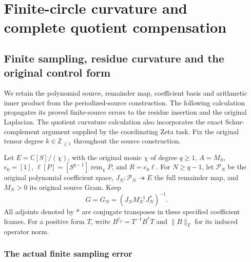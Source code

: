 \begingroup

\section{Finite-circle curvature and complete quotient compensation}


\subsection{Finite sampling, residue curvature and the original control form}
\label{sec:periodized-curvature-control}

We retain the polynomial source, remainder map, coefficient basis and
arithmetic inner product from the periodized-source construction. The
following calculation propagates its proved finite-source errors to the
residue insertion and the original Laplacian. The quotient curvature
calculation also incorporates the exact Schur-complement argument supplied
by the coordinating Zeta task. Fix the original tensor degree
$k\in\mathbb Z_{\ge1}$ throughout the source construction.

Let $E=\mathbb C[S]/(\chi)$, with the original monic $\chi$ of degree
$q\ge1$, $A=M_S$, $e_0=[1]$, $\ell[P]=[S^{q-1}]\operatorname{rem}_\chi P$,
and $R=e_0\ell$. For $N\ge q-1$, let $\mathcal P_N$ be the original
polynomial coefficient space, $J_N:\mathcal P_N\twoheadrightarrow E$
the full remainder map, and $M_N>0$ its original source Gram. Keep
\[
 G=G_N=(J_NM_N^{-1}J_N^*)^{-1}.
 \tag{FC1}
\]
All adjoints denoted by $*$ are conjugate transposes in these specified
coefficient frames. For a positive form $T$, write
$B^{\dagger_T}=T^{-1}B^*T$ and $\|B\|_T$ for its induced operator norm.

\subsubsection{The actual finite sampling error}

